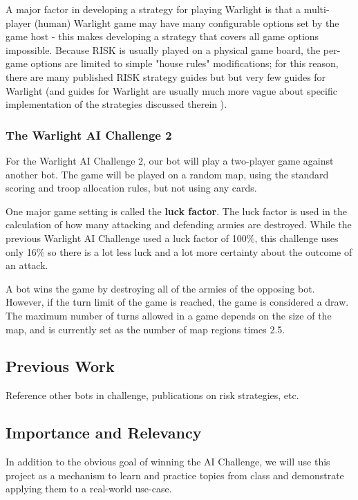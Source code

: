 \documentclass[a4paper,11pt]{article}
\begin{document}
A major factor in developing a strategy for playing Warlight is that a multi-player 
(human) Warlight game may have many configurable options set by the game host - 
this makes developing a strategy that covers all game options impossible. Because 
RISK is usually played on a physical game board, the per-game options are limited 
to simple "house rules" modifications; for this reason, there are many published 
RISK strategy guides but but very few guides for Warlight (and guides for Warlight 
are usually much more vague about specific implementation of the strategies 
discussed therein \cite{warlightguide}).

\subsubsection{The Warlight AI Challenge 2}
For the Warlight AI Challenge 2, our bot will play a two-player game against 
another bot.  The game will be played on a random map, using the standard scoring 
and troop allocation rules, but not using any cards.

One major game setting is called the \textbf{luck factor}. The luck factor is used 
in the calculation of how many attacking and defending armies are destroyed.  While 
the previous Warlight AI Challenge used a luck factor of 100\%, this challenge uses 
only 16\% so there is a lot less luck and a lot more certainty about the outcome of 
an attack.

A bot wins the game by destroying all of the armies of the opposing bot.  However, 
if the turn limit of the game is reached, the game is considered a draw.  The 
maximum number of turns allowed in a game depends on the size of the map, and is 
currently set as the number of map regions times 2.5.

\subsection{Previous Work}\label{sec:previous}
Reference other bots in challenge, publications on risk strategies, etc.

\subsection{Importance and Relevancy}\label{sec:importance}
In addition to the obvious goal of winning the AI Challenge, we will use this
project as a mechanism to learn and practice topics from class and demonstrate
applying them to a real-world use-case.
\end{document}

